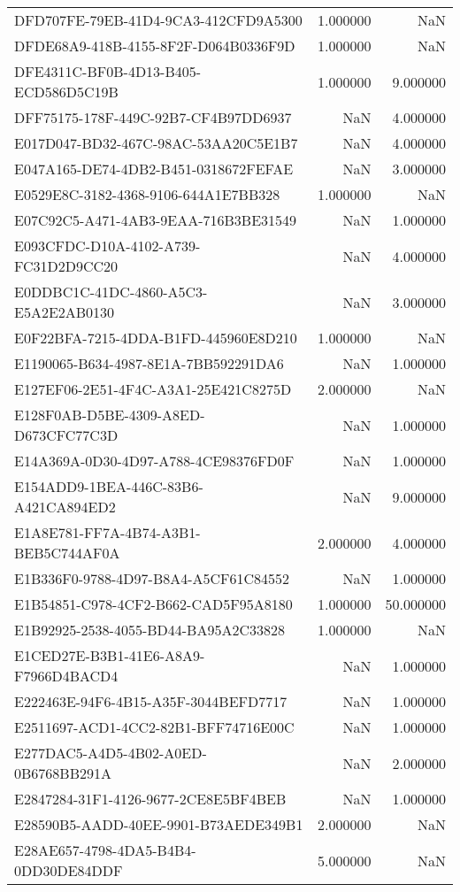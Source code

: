 \begin{tabular}{lrr}
DFD707FE-79EB-41D4-9CA3-412CFD9A5300 & 1.000000 & NaN \\
DFDE68A9-418B-4155-8F2F-D064B0336F9D & 1.000000 & NaN \\
DFE4311C-BF0B-4D13-B405-ECD586D5C19B & 1.000000 & 9.000000 \\
DFF75175-178F-449C-92B7-CF4B97DD6937 & NaN & 4.000000 \\
E017D047-BD32-467C-98AC-53AA20C5E1B7 & NaN & 4.000000 \\
E047A165-DE74-4DB2-B451-0318672FEFAE & NaN & 3.000000 \\
E0529E8C-3182-4368-9106-644A1E7BB328 & 1.000000 & NaN \\
E07C92C5-A471-4AB3-9EAA-716B3BE31549 & NaN & 1.000000 \\
E093CFDC-D10A-4102-A739-FC31D2D9CC20 & NaN & 4.000000 \\
E0DDBC1C-41DC-4860-A5C3-E5A2E2AB0130 & NaN & 3.000000 \\
E0F22BFA-7215-4DDA-B1FD-445960E8D210 & 1.000000 & NaN \\
E1190065-B634-4987-8E1A-7BB592291DA6 & NaN & 1.000000 \\
E127EF06-2E51-4F4C-A3A1-25E421C8275D & 2.000000 & NaN \\
E128F0AB-D5BE-4309-A8ED-D673CFC77C3D & NaN & 1.000000 \\
E14A369A-0D30-4D97-A788-4CE98376FD0F & NaN & 1.000000 \\
E154ADD9-1BEA-446C-83B6-A421CA894ED2 & NaN & 9.000000 \\
E1A8E781-FF7A-4B74-A3B1-BEB5C744AF0A & 2.000000 & 4.000000 \\
E1B336F0-9788-4D97-B8A4-A5CF61C84552 & NaN & 1.000000 \\
E1B54851-C978-4CF2-B662-CAD5F95A8180 & 1.000000 & 50.000000 \\
E1B92925-2538-4055-BD44-BA95A2C33828 & 1.000000 & NaN \\
E1CED27E-B3B1-41E6-A8A9-F7966D4BACD4 & NaN & 1.000000 \\
E222463E-94F6-4B15-A35F-3044BEFD7717 & NaN & 1.000000 \\
E2511697-ACD1-4CC2-82B1-BFF74716E00C & NaN & 1.000000 \\
E277DAC5-A4D5-4B02-A0ED-0B6768BB291A & NaN & 2.000000 \\
E2847284-31F1-4126-9677-2CE8E5BF4BEB & NaN & 1.000000 \\
E28590B5-AADD-40EE-9901-B73AEDE349B1 & 2.000000 & NaN \\
E28AE657-4798-4DA5-B4B4-0DD30DE84DDF & 5.000000 & NaN \\

\end{tabular}
